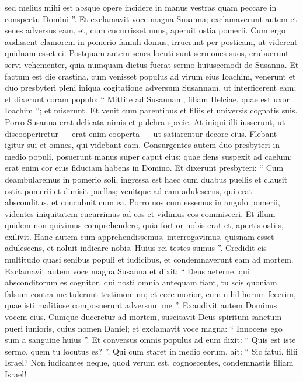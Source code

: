 \begin{biblechapter}
\begin{biblechapter}
\begin{biblechapter}
\begin{biblechapter}
\begin{biblechapter}
\begin{biblechapter}
\begin{biblechapter}
\begin{biblechapter}
\begin{biblechapter}
\begin{biblechapter}
\begin{biblechapter}
\begin{biblechapter}
\begin{biblechapter}
\verse sed melius mihi est absque opere incidere in manus vestras quam peccare in conspectu Domini ”. 
\verse Et exclamavit voce magna Susanna; exclamaverunt autem et senes adversus eam, 
\verse et, cum cucurrisset unus, aperuit ostia pomerii.
 \verse Cum ergo audissent clamorem in pomerio famuli domus, irruerunt per posticam, ut viderent quidnam esset ei. 
\verse Postquam autem senes locuti sunt sermones suos, erubuerunt servi vehementer, quia numquam dictus fuerat sermo huiuscemodi de Susanna. Et factum est die crastina, 
\verse cum venisset populus ad virum eius Ioachim, venerunt et duo presbyteri pleni iniqua cogitatione adversum Susannam, ut interficerent eam; 
\verse et dixerunt coram populo: “ Mittite ad Susannam, filiam Helciae, quae est uxor Ioachim ”; et miserunt. 
\verse Et venit cum parentibus et filiis et universis cognatis suis. 
\verse Porro Susanna erat delicata nimis et pulchra specie. 
\verse At iniqui illi iusserunt, ut discooperiretur — erat enim cooperta — ut satiarentur decore eius. 
\verse Flebant igitur sui et omnes, qui videbant eam. 
\verse Consurgentes autem duo presbyteri in medio populi, posuerunt manus super caput eius; 
\verse quae flens suspexit ad caelum: erat enim cor eius fiduciam habens in Domino. 
\verse Et dixerunt presbyteri: “ Cum deambularemus in pomerio soli, ingressa est haec cum duabus puellis et clausit ostia pomerii et dimisit puellas; 
\verse venitque ad eam adulescens, qui erat absconditus, et concubuit cum ea. 
\verse Porro nos cum essemus in angulo pomerii, videntes iniquitatem cucurrimus ad eos et vidimus eos commisceri. 
\verse Et illum quidem non quivimus comprehendere, quia fortior nobis erat et, apertis ostiis, exilivit. 
\verse Hanc autem cum apprehendissemus, interrogavimus, quisnam esset adulescens, et noluit indicare nobis. Huius rei testes sumus ”. 
\verse Credidit eis multitudo quasi senibus populi et iudicibus, et condemnaverunt eam ad mortem.
 \verse Exclamavit autem voce magna Susanna et dixit: “ Deus aeterne, qui absconditorum es cognitor, qui nosti omnia antequam fiant, 
\verse tu scis quoniam falsum contra me tulerunt testimonium; et ecce morior, cum nihil horum fecerim, quae isti malitiose composuerunt adversum me ”.
 \verse Exaudivit autem Dominus vocem eius. 
\verse Cumque duceretur ad mortem, suscitavit Deus spiritum sanctum pueri iunioris, cuius nomen Daniel; 
\verse et exclamavit voce magna: “ Innocens ego sum a sanguine huius ”. 
\verse Et conversus omnis populus ad eum dixit: “ Quis est iste sermo, quem tu locutus es? ”. 
\verse Qui cum staret in medio eorum, ait: “ Sic fatui, filii Israel? Non iudicantes neque, quod verum est, cognoscentes, condemnastis filiam Israel! 

\end{biblechapter}
\end{biblechapter}
\end{biblechapter}
\end{biblechapter}
\end{biblechapter}
\end{biblechapter}
\end{biblechapter}
\end{biblechapter}
\end{biblechapter}
\end{biblechapter}
\end{biblechapter}
\end{biblechapter}
\end{biblechapter}
